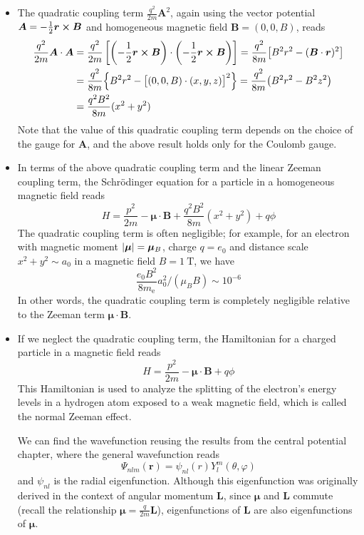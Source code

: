 \documentclass[11pt, a4paper]{article}
\newcommand{\Schro}{Schr\"{o}dinger\xspace}
\newcommand{\Ham}{Hamiltonian\xspace}
\renewcommand{\vec}[1]{\bm{#1}}  %
\renewcommand{\r}{\vec{r}}  %
\renewcommand{\L}{\vec{L}}  %
\newcommand{\A}{\vec{A}}  %
\newcommand{\B}{\vec{B}}  %
\newcommand{\m}{\vec{\mu}}  %
\newcommand{\p}{\psi}  %
\renewcommand{\P}{\Psi}  %
\begin{document}
\begin{itemize}
	\item The quadratic coupling term $ \frac{q^{2}}{2m}\A^{2} $, again using the vector potential $ \A = -\frac{1}{2}\r \cross \vec{B} $ and homogeneous magnetic field $ \B = (0, 0, B) $, reads
	\begin{align*}
		\frac{q^{2}}{2m} \A \cdot \A &= \frac{q^{2}}{2m}\left[\left(-\frac{1}{2}\r \cross \vec{B}\right) \cdot \left(-\frac{1}{2}\r \cross \vec{B}\right)\right] = \frac{q^{2}}{8m}\big[B^{2}r^{2} - (\B \cdot \r)^{2}\big]\\
		& = \frac{q^{2}}{8m}\Big\{ B^{2}r^{2} - \big[(0, 0, B)\cdot (x, y, z)\big]^{2}\Big\} = \frac{q^{2}}{8m} \big(B^{2}r^{2} - B^{2}z^{2}\big)\\
		& = \frac{q^{2}B^{2}}{8m}(x^{2} + y^{2})
	\end{align*}
	Note that the value of this quadratic coupling term depends on the choice of the gauge for $ \A $, and the above result holds only for the Coulomb gauge.
	
	\item In terms of the above quadratic coupling term and the linear Zeeman coupling term, the \Schro equation for a particle in a homogeneous magnetic field reads
	\begin{equation*}
		H = \frac{p^{2}}{2m} - \m \cdot \B + \frac{q^{2}B^{2}}{8m}(x^{2} + y^{2}) + q\phi
	\end{equation*}
	The quadratic coupling term is often negligible; for example, for an electron with magnetic moment $ \abs{\m} = \m_{B}$, charge $ q = e_{0} $ and distance scale $ x^{2} + y^{2} \sim a_{0} $ in a magnetic field $ B = \SI{1}{\tesla} $, we have
	\begin{equation*}
		\frac{e_{0}B^{2}}{8m_{\text{e}}}a_{0}^{2} \Big / (\mu_{B}B) \sim 10^{-6}
	\end{equation*}
	In other words, the quadratic coupling term is completely negligible relative to the Zeeman term $ \m \cdot \B $. 
	
	\item If we neglect the quadratic coupling term, the Hamiltonian for a charged particle  in a magnetic field reads
	\begin{equation*}
		H = \frac{p^{2}}{2m} - \m \cdot \B + q \phi
	\end{equation*}
	This \Ham is used to analyze the splitting of the electron's energy levels in a hydrogen atom exposed to a weak magnetic field, which is called the normal Zeeman effect. 
	
	We can find the wavefunction reusing the results from the central potential chapter, where the general wavefunction reads
	\begin{equation*}
		\P_{nlm}(\r) = \p_{nl}(r) Y_{l}^{m}(\theta, \varphi)
	\end{equation*}
	and $ \p_{nl} $ is the radial eigenfunction. Although this eigenfunction was originally derived in the context of angular momentum $ \vec{L} $, since $ \m $ and $ \L $ commute (recall the relationship $ \m = \frac{q}{2m}\L $), eigenfunctions of $ \L $ are also eigenfunctions of $ \m $. 
	

\end{itemize}
\end{document}
